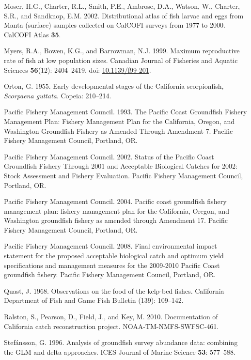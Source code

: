 \documentclass[12pt,]{article}
\begin{document}
\hypertarget{ref-Moser2002}{}
Moser, H.G., Charter, R.L., Smith, P.E., Ambrose, D.A., Watson, W.,
Charter, S.R., and Sandknop, E.M. 2002. Distributional atlas of fish
larvae and eggs from Manta (surface) samples collected on CalCOFI
surveys from 1977 to 2000. CalCOFI Atlas \textbf{35}.

\hypertarget{ref-Myers1999}{}
Myers, R.A., Bowen, K.G., and Barrowman, N.J. 1999. Maximum reproductive
rate of fish at low population sizes. Canadian Journal of Fisheries and
Aquatic Sciences \textbf{56}(12): 2404--2419. doi:
\href{https://doi.org/10.1139/f99-201}{10.1139/f99-201}.

\hypertarget{ref-Orton1955}{}
Orton, G. 1955. Early developmental stages of the California
scorpionfish, \emph{Scorpaena guttata}. Copeia: 210--214.

\hypertarget{ref-PFMC1993}{}
Pacific Fishery Management Council. 1993. The Pacific Coast Groundfish
Fishery Management Plan: Fishery Management Plan for the California,
Oregon, and Washington Groundfish Fishery as Amended Through Amendment
7. Pacific Fishery Management Council, Portland, OR.

\hypertarget{ref-PFMC2002}{}
Pacific Fishery Management Council. 2002. Status of the Pacific Coast
Groundfish Fishery Through 2001 and Acceptable Biological Catches for
2002: Stock Assessment and Fishery Evaluation. Pacific Fishery
Management Council, Portland, OR.

\hypertarget{ref-PFMC2004}{}
Pacific Fishery Management Council. 2004. Pacific coast groundfish
fishery management plan: fishery management plan for the California,
Oregon, and Washington groundfish fishery as amended through Amendment
17. Pacific Fishery Management Council, Portland, OR.

\hypertarget{ref-PFMC2008}{}
Pacific Fishery Management Council. 2008. Final environmental impact
statement for the proposed acceptable biological catch and optimum yield
specifications and management measures for the 2009-2010 Pacific Coast
groundfish fishery. Pacific Fishery Management Council, Portland, OR.

\hypertarget{ref-Quast1968}{}
Quast, J. 1968. Observations on the food of the kelp-bed fishes.
California Department of Fish and Game Fish Bulletin (139): 109--142.

\hypertarget{ref-Ralston2010}{}
Ralston, S., Pearson, D., Field, J., and Key, M. 2010. Documentation of
California catch reconstruction project. NOAA-TM-NMFS-SWFSC-461.

\hypertarget{ref-Stefansson1996}{}
Stefánsson, G. 1996. Analysis of groundfish survey abundance data:
combining the GLM and delta approaches. ICES Journal of Marine Science
\textbf{53}: 577--588.
\end{document}
